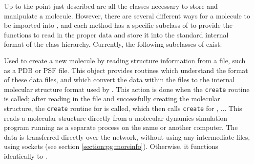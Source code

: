 Up to the point just described are all the classes necessary to store and manipulate a molecule.  However, there are several different ways for a molecule to be imported into \VMD, and each method has a specific subclass of  to provide the functions to read in the proper data and store it into the standard internal format of the  class hierarchy.  Currently, the following subclasses of  exist:
\begin{itemize}
Used to create a new molecule by reading structure information from a file, such as a PDB or PSF file.  This object provides routines which understand the format of these data files, and which convert the data within the files to the internal molecular structure format used by .  This action is done when the {\tt create} routine is called; after reading in the file and successfully creating the molecular structure, the {\tt create} routine for  is called, which then calls {\tt create} for , $\ldots$
This reads a molecular structure directly from a molecular dynamics simulation program running as a separate process on the same or another computer.  The data is transferred directly over the network, without using any intermediate files, using sockets (see section \ref{section:pg:moreinfo}).  Otherwise, it functions identically to .
\end{itemize}

